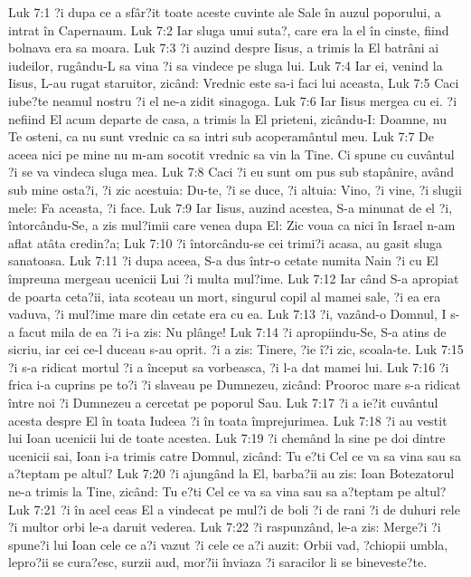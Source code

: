 Luk 7:1  ?i dupa ce a sfâr?it toate aceste cuvinte ale Sale în auzul poporului, a intrat în Capernaum.
Luk 7:2  Iar sluga unui suta?, care era la el în cinste, fiind bolnava era sa moara.
Luk 7:3  ?i auzind despre Iisus, a trimis la El batrâni ai iudeilor, rugându-L sa vina ?i sa vindece pe sluga lui.
Luk 7:4  Iar ei, venind la Iisus, L-au rugat staruitor, zicând: Vrednic este sa-i faci lui aceasta,
Luk 7:5  Caci iube?te neamul nostru ?i el ne-a zidit sinagoga.
Luk 7:6  Iar Iisus mergea cu ei. ?i nefiind El acum departe de casa, a trimis la El prieteni, zicându-I: Doamne, nu Te osteni, ca nu sunt vrednic ca sa intri sub acoperamântul meu.
Luk 7:7  De aceea nici pe mine nu m-am socotit vrednic sa vin la Tine. Ci spune cu cuvântul ?i se va vindeca sluga mea.
Luk 7:8  Caci ?i eu sunt om pus sub stapânire, având sub mine osta?i, ?i zic acestuia: Du-te, ?i se duce, ?i altuia: Vino, ?i vine, ?i slugii mele: Fa aceasta, ?i face.
Luk 7:9  Iar Iisus, auzind acestea, S-a minunat de el ?i, întorcându-Se, a zis mul?imii care venea dupa El: Zic voua ca nici în Israel n-am aflat atâta credin?a;
Luk 7:10  ?i întorcându-se cei trimi?i acasa, au gasit sluga sanatoasa.
Luk 7:11  ?i dupa aceea, S-a dus într-o cetate numita Nain ?i cu El împreuna mergeau ucenicii Lui ?i multa mul?ime.
Luk 7:12  Iar când S-a apropiat de poarta ceta?ii, iata scoteau un mort, singurul copil al mamei sale, ?i ea era vaduva, ?i mul?ime mare din cetate era cu ea.
Luk 7:13  ?i, vazând-o Domnul, I s-a facut mila de ea ?i i-a zis: Nu plânge!
Luk 7:14  ?i apropiindu-Se, S-a atins de sicriu, iar cei ce-l duceau s-au oprit. ?i a zis: Tinere, ?ie î?i zic, scoala-te.
Luk 7:15  ?i s-a ridicat mortul ?i a început sa vorbeasca, ?i l-a dat mamei lui.
Luk 7:16  ?i frica i-a cuprins pe to?i ?i slaveau pe Dumnezeu, zicând: Prooroc mare s-a ridicat între noi ?i Dumnezeu a cercetat pe poporul Sau.
Luk 7:17  ?i a ie?it cuvântul acesta despre El în toata Iudeea ?i în toata împrejurimea.
Luk 7:18  ?i au vestit lui Ioan ucenicii lui de toate acestea.
Luk 7:19  ?i chemând la sine pe doi dintre ucenicii sai, Ioan i-a trimis catre Domnul, zicând: Tu e?ti Cel ce va sa vina sau sa a?teptam pe altul?
Luk 7:20  ?i ajungând la El, barba?ii au zis: Ioan Botezatorul ne-a trimis la Tine, zicând: Tu e?ti Cel ce va sa vina sau sa a?teptam pe altul?
Luk 7:21  ?i în acel ceas El a vindecat pe mul?i de boli ?i de rani ?i de duhuri rele ?i multor orbi le-a daruit vederea.
Luk 7:22  ?i raspunzând, le-a zis: Merge?i ?i spune?i lui Ioan cele ce a?i vazut ?i cele ce a?i auzit: Orbii vad, ?chiopii umbla, lepro?ii se cura?esc, surzii aud, mor?ii înviaza ?i saracilor li se bineveste?te.

